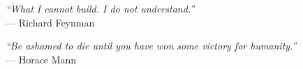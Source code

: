 \clearpage
\thispagestyle{empty}

\begin{flushright}
\begin{minipage}{0.58\textwidth}
    \raggedleft

    \textit{``What I cannot build. I do not understand.''}\\
    \vspace{0.5em}
    --- Richard Feynman

    \vspace{2cm}

    \textit{``Be ashamed to die until you have won some victory for humanity.''}\\
    \vspace{0.5em}
    --- Horace Mann

\end{minipage}
\end{flushright}

\clearpage
